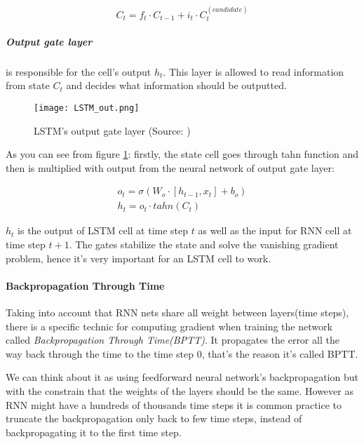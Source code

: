 \begin{equation} \label{eq:update_state}
	C_t = f_t \cdot C_{t-1} + i_t \cdot C_t^{(candidate)}
\end{equation}

\subparagraph{Output gate layer} is responsible for the cell's output $h_t$.
This layer is allowed to read information from state $C_t$ and decides what information
should be outputted.

\begin{figure}[H]
	\texttt{[image: LSTM\_out.png]}
	\caption{
		LSTM's output gate layer (Source: \cite{ColahChristopher2015})
		}
	\label{img:lstm_out}
\end{figure}

As you can see from figure \ref{img:lstm_out}: firstly, the state cell goes
through tahn function and then is multiplied
with output from the neural network of output gate layer:

\begin{align} \label{eq:out_gate}
	o_t = \sigma (W_o \cdot [h_{t-1}, x_t] + b_o) \\
	h_t = o_t \cdot tahn(C_t)
\end{align}

$h_t$ is the output of LSTM cell at time step $t$ as well as the input
for RNN cell at time step $t+1$. The gates stabilize the state and solve the
vanishing gradient problem, hence it's very important for an LSTM
cell to work.\cite{Goodfellow-et-al-2016}

\paragraph{Backpropagation Through Time} Taking into account that RNN nets
share all weight between layers(time steps), there is a specific
technic for computing
gradient when training the network called \emph{Backpropagation Through Time(BPTT)}.
It propagates the error all the way back through the time to the time step 0,
that's the reason it's called BPTT. \cite{werbos:bptt}

We can think about it as using feedforward neural network's backpropagation
but with the constrain that the weights of the layers should be the same.
However as RNN might have a hundreds of thousands time steps it is common
practice to truncate the backpropagation only back to few time steps, instead
of backpropagating it to the first time step.


